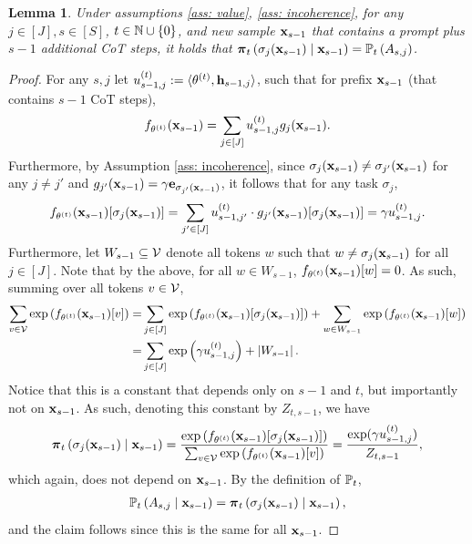\documentclass{article}
\theoremstyle{plain}
\newtheorem{lemma}[theorem]{Lemma}
\theoremstyle{definition}
\theoremstyle{remark}
\begin{document}
\begin{lemma}\label{lem:prefix_indif}
    Under assumptions \ref{ass: value}, \ref{ass: incoherence}, for any $j\in[J], s\in[S]$, $t \in \N \cup \{0\}$, and new sample $\bx_{s-1}$ that contains a prompt plus $s-1$ additional CoT steps, it holds that $\bpi_t\left(\sigma_j(\bx_{s-1}) \mid \bx_{s-1}\right) = \P_t\left(A_{s,j}\right)$. 
\end{lemma}
\begin{proof}
    For any $s,j$ let $u^{(t)}_{s-1, j} := \langle \theta^{(t)}, \bh_{s-1, j} \rangle$, such that for prefix $\bx_{s-1}$ (that contains $s-1$ CoT steps),
    \begin{align*}
        f_{\theta^{(t)}}(\bx_{s-1}) = \sum_{j\in [J]} u^{(t)}_{s-1, j} g_j(\bx_{s-1}).
    \end{align*}
    Furthermore, by Assumption \ref{ass: incoherence}, since $\sigma_j(\bx_{s-1})\neq \sigma_{j'}(\bx_{s-1})$ for any $j\neq j'$ and $g_{j'}(\bx_{s-1})= \gamma \be_{\sigma_{j'}(\bx_{s-1})}$, it follows that for any task $\sigma_j$,
    \begin{align*}
        f_{\theta^{(t)}}(\bx_{s-1})[\sigma_j(\bx_{s-1})] 
        = \sum_{j' \in [J]}u^{(t)}_{s-1, j'} \cdot g_{j'}(\bx_{s-1})[\sigma_j(\bx_{s-1})] 
        = \gamma u^{(t)}_{s-1, j}.
    \end{align*}
    Furthermore, let $W_{s-1}\subseteq \Vcal$ denote all tokens $w$ such that $w\neq \sigma_j(\bx_{s-1})$ for all $j\in[J]$. Note that by the above, for all $w
    \in W_{s-1}$, $f_{\theta^{(t)}}(\bx_{s-1})[w] = 0$. As such, summing over all tokens $v \in \Vcal$,
    \begin{align*}
        \sum_{v\in \Vcal} \exp\left(f_{\theta^{(t)}}(\bx_{s-1})[v]\right) 
        = &\sum_{j\in[J]} \exp\left(f_{\theta^{(t)}}(\bx_{s-1})[\sigma_j(\bx_{s-1})]\right) 
        + \sum_{w \in W_{s-1}} \exp\left(f_{\theta^{(t)}}(\bx_{s-1})[w]\right) 
        \\ 
        = & \sum_{j\in [J]} \exp\left(\gamma u^{(t)}_{s-1, j}\right) + \abs{W_{s-1}}.
    \end{align*}
    Notice that this is a constant that depends only on $s-1$ and $t$, but importantly not on $\bx_{s-1}$.
    As such, denoting this constant by $Z_{t, s-1}$, we have
    \begin{align*}
        \bpi_t\left(\sigma_{j}(\bx_{s-1}) \mid \bx_{s-1}\right) = \frac{\exp\left(f_{\theta^{(t)}}(\bx_{s-1})[\sigma_{j}(\bx_{s-1})]\right)}{\sum_{v \in \Vcal} \exp\left(f_{\theta^{(t)}}(\bx_{s-1})[v] \right)} = \frac{\exp(\gamma u^{(t)}_{s-1, j})}{Z_{t, s-1}},
    \end{align*}
    which again, does not depend on $\bx_{s-1}$. By the definition of $\P_t$, 
    \begin{align*}
         \P_t\left(A_{s,j} \mid \bx_{s-1}\right) = \bpi_t\left(\sigma_{j}(\bx_{s-1}) \mid \bx_{s-1}\right),
    \end{align*}
    and the claim follows since this is the same for all $\bx_{s-1}$.
\end{proof}
\end{document}
